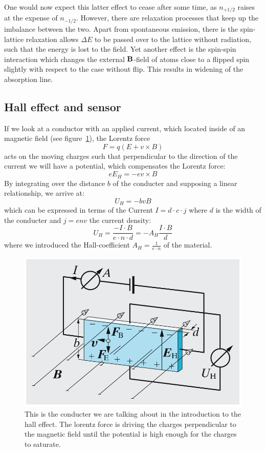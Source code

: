 One would now expect this latter effect to cease after some time, as $n_{+1/2}$ raises at the expense of 
$n_{-1/2}$. However, there are relaxation processes that keep up the imbalance between the two. 
Apart from spontaneous emission, there is the spin-lattice relaxation allows $\Delta E$ to be passed 
over to the lattice without radiation, such that the energy is lost to the field. 
Yet another effect is the spin-spin interaction which changes the external $\mathbf{B}$-field of atoms close 
to a flipped spin slightly with respect to the case without flip. This results in widening of the 
absorption line. 

\subsection{Hall effect and sensor}
If we look at a conductor with an applied current, which located inside of an magnetic field
(see figure~\ref{fig:halleffect}), the Lorentz force
\begin{equation}
    F = q ( E + v \times B)
\end{equation}
acts on the moving charges such that perpendicular to the direction of the current we will have a potential,
which compensates the Lorentz force:
\begin{equation}
    e E_H = -e v \times B
\end{equation}
By integrating over the distance $b$ of the conducter and supposing a linear
relationship, we arrive at:
\begin{equation}
    U_H = - b v B
\end{equation}
which can be expressed in terms of the Current $I = d \cdot c \cdot j$ where $d$ is the width of the 
conducter and $j=e n v$ the current density:
\begin{equation}
    U_H = \frac{- I\cdot B}{e\cdot n\cdot d}  = -A_H \frac{I\cdot B}{d}
\end{equation}
where we introduced the Hall-coefficient $A_H =\frac{1}{e\cdot n}$ of the material.
\begin{figure}[htpb]
    \centering
    \includegraphics[width=0.8\linewidth]{figures/halleffect}
    \caption{This is the conducter we are talking about in the introduction \cite{gerthsen} to the hall effect.
    The lorentz force is driving the charges perpendicular to the magnetic field until the potential is 
    high enough for the charges to saturate.}
    \label{fig:halleffect}
\end{figure}





